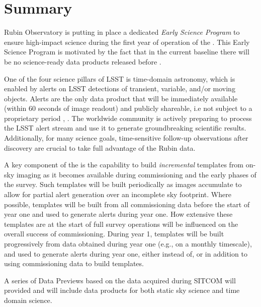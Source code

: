 \section{Summary}

Rubin Observatory is putting in place a dedicated {\it Early Science Program} to ensure high-impact science during the first year of operation of the \lsst.
This Early Science Program is motivated by the fact that in the current baseline there will be no science-ready data products released before \drone. 

One of the four science pillars of LSST is time-domain astronomy, which is enabled by alerts on LSST detections of transient, variable, and/or moving objects. 
Alerts are the only data product that will be immediately available (within 60 seconds of image readout) and publicly shareable, i.e not subject to a proprietary period \citep{LSE-163},  \citep{RDO-013}. 
The worldwide community is actively preparing to process the LSST alert stream and use it to generate groundbreaking scientific results. Additionally, for many science goals, time-sensitive follow-up observations after discovery are crucial to take full advantage of the Rubin data. 

A key component of the \esp is the capability to build {\it incremental} templates from on-sky imaging as it becomes available during commissioning and the early phases of the survey. 
Such templates will be built periodically as images accumulate to allow for partial alert generation over an incomplete sky footprint.
Where possible, templates will be built from all commissioning data before the start of year one and used to generate alerts during year one.
How extensive these templates are at the start of full survey operations will be influenced on the overall success of commissioning.
During year 1, templates will be built progressively from data obtained during year one (e.g., on a monthly timescale), and used to generate alerts during year one, either instead of, or in addition to using commissioning data to build templates.

A series of Data Previews based on the data acquired during SITCOM will provided and will include data products for both static sky science and time domain science.